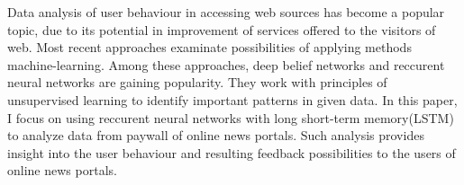 Data analysis of user behaviour in accessing web sources has become a popular topic, due to its potential in improvement of services offered to the visitors of web. Most recent approaches examinate possibilities of applying methods machine-learning.
Among these approaches, deep belief networks and reccurent neural networks are gaining popularity. They work with principles of unsupervised learning to identify important patterns in given data. In this paper, I focus on using reccurent neural networks with long short-term memory(LSTM) to analyze data from paywall of online news portals. Such analysis provides insight into the user behaviour and resulting feedback possibilities to the users of online news portals.

